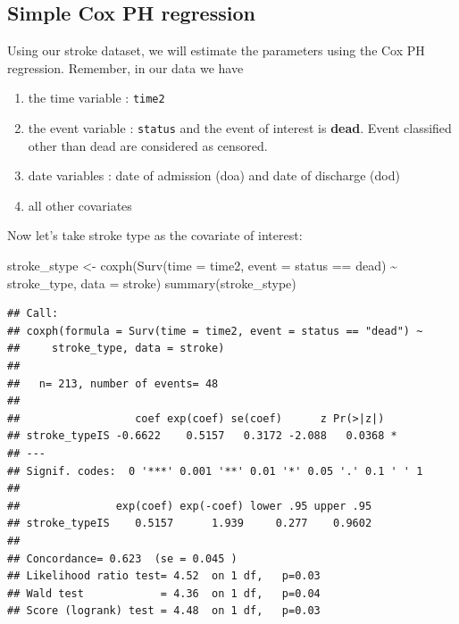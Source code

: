 \documentclass[
  10pt,
]{krantz}
\newenvironment{Shaded}{\begin{snugshade}}{\end{snugshade}}
\newcommand{\AttributeTok}[1]{\textcolor[rgb]{0.77,0.63,0.00}{#1}}
\newcommand{\FunctionTok}[1]{\textcolor[rgb]{0.00,0.00,0.00}{#1}}
\newcommand{\NormalTok}[1]{#1}
\newcommand{\OtherTok}[1]{\textcolor[rgb]{0.56,0.35,0.01}{#1}}
\newcommand{\SpecialCharTok}[1]{\textcolor[rgb]{0.00,0.00,0.00}{#1}}
\newcommand{\StringTok}[1]{\textcolor[rgb]{0.31,0.60,0.02}{#1}}
\providecommand{\tightlist}{%
  \setlength{\itemsep}{0pt}\setlength{\parskip}{0pt}}
\begin{document}
\hypertarget{simple-cox-ph-regression}{%
\subsection{Simple Cox PH regression}\label{simple-cox-ph-regression}}

Using our stroke dataset, we will estimate the parameters using the Cox PH regression. Remember, in our data we have

\begin{enumerate}
\def\labelenumi{\arabic{enumi}.}
\tightlist
\item
  the time variable : \texttt{time2}
\item
  the event variable : \texttt{status} and the event of interest is \textbf{dead}. Event classified other than dead are considered as censored.
\item
  date variables : date of admission (doa) and date of discharge (dod)
\item
  all other covariates
\end{enumerate}

Now let's take stroke type as the covariate of interest:

\begin{Shaded}
\begin{Highlighting}[]
\NormalTok{stroke\_stype }\OtherTok{\textless{}{-}} 
  \FunctionTok{coxph}\NormalTok{(}\FunctionTok{Surv}\NormalTok{(}\AttributeTok{time =}\NormalTok{ time2, }
             \AttributeTok{event =}\NormalTok{ status }\SpecialCharTok{==} \StringTok{\textquotesingle{}dead\textquotesingle{}}\NormalTok{) }\SpecialCharTok{\textasciitilde{}}\NormalTok{ stroke\_type,}
                     \AttributeTok{data =}\NormalTok{ stroke)}
\FunctionTok{summary}\NormalTok{(stroke\_stype)}
\end{Highlighting}
\end{Shaded}

\begin{verbatim}
## Call:
## coxph(formula = Surv(time = time2, event = status == "dead") ~ 
##     stroke_type, data = stroke)
## 
##   n= 213, number of events= 48 
## 
##                  coef exp(coef) se(coef)      z Pr(>|z|)  
## stroke_typeIS -0.6622    0.5157   0.3172 -2.088   0.0368 *
## ---
## Signif. codes:  0 '***' 0.001 '**' 0.01 '*' 0.05 '.' 0.1 ' ' 1
## 
##               exp(coef) exp(-coef) lower .95 upper .95
## stroke_typeIS    0.5157      1.939     0.277    0.9602
## 
## Concordance= 0.623  (se = 0.045 )
## Likelihood ratio test= 4.52  on 1 df,   p=0.03
## Wald test            = 4.36  on 1 df,   p=0.04
## Score (logrank) test = 4.48  on 1 df,   p=0.03
\end{verbatim}
\end{document}
